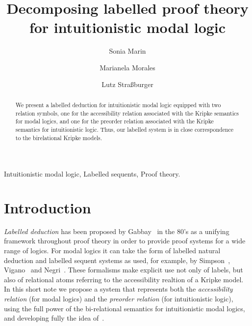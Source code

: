 \documentclass[twoside]{aiml18}
\begin{document}
\begin{frontmatter}
  \title{Decomposing labelled proof theory for intuitionistic modal logic}
  \author{Sonia Marin}
  \address{IT-Universitetet i K{\o}benhavn \\ Denmark }
 \author{Marianela Morales}
 \address{Universidad Nacional de C\'ordoba \\ Argentina}
   \author{Lutz Stra{\ss}burger}
 \address{Inria Saclay \& LIX, \'Ecole Polytechnique \\ France}

 \begin{abstract}
   We present a labelled deduction for intuitionistic modal logic equipped 
   with two relation symbols, one for the accessibility
   relation associated with the Kripke semantics for modal logics, and
   one for the preorder relation associated with the Kripke semantics
   for intuitionistic logic. 
   Thus, our labelled system is in close correspondence to the birelational Kripke models.


  \end{abstract}

  \begin{keyword}
  Intuitionistic modal logic, Labelled sequents, Proof theory.
  \end{keyword}
 \end{frontmatter}


\section{Introduction}

\emph{Labelled deduction} has been proposed by Gabbay~\cite{Gabbay} in the 80's as a unifying framework throughout proof theory in order to provide proof
systems for a wide range of logics. 
%
For modal logics it can take
the form of labelled natural deduction and labelled sequent systems as
used, for example, by Simpson~\cite{Simpson}, Vigano~\cite{Vigano} and
Negri~\cite{Negri}. 
%
These formalisms make explicit use not only of
labels, but also of relational atoms referring to the accessibility realtion of a Kripke model.
%
In this short note we propose a system that represents both the \emph{accessibility relation} (for modal
logics) and the \emph{preorder relation} (for intuitionistic
logic), using the full power of the bi-relational semantics for
intuitionistic modal logics,
and developing fully the idea of~\cite{Maffezioli}. 
\end{document}
